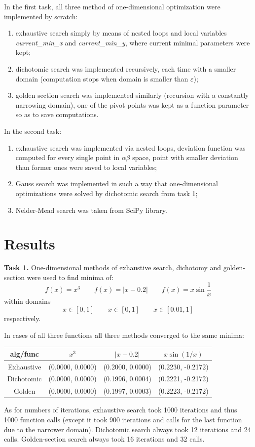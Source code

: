 \documentclass[12pt, a4paper]{article}
\begin{document}
In the first task, all three method of one-dimensional optimization were implemented by scratch: 
\begin{enumerate}
	\item exhaustive search simply by means of nested loops and local variables \textit{current\_min\_x} and \textit{current\_min\_y}, where current minimal parameters were kept;
	\item dichotomic search was implemented recursively, each time with a smaller domain (computation stops when domain is smaller than $\varepsilon$);
	\item golden section search was implemented similarly (recursion with a constantly narrowing domain), one of the pivot points was kept as a function parameter so as to save computations.
\end{enumerate}

In the second task:
\begin{enumerate}
	\item exhaustive search was implemented via nested loops, deviation function was computed for every single point in $\alpha \beta$ space, point with smaller deviation than former ones were saved to local variables;
	\item Gauss search was implemented in such a way that one-dimensional optimizations were solved by dichotomic search from task 1;
	\item Nelder-Mead search was taken from SciPy library.
\end{enumerate}

\newpage

\section*{Results}

\textbf{Task 1.} One-dimensional methods of exhaustive search, dichotomy and golden-section were used to find minima of:
\[ f(x) = x^3 \qquad f(x) = |x-0.2| \qquad f(x) = x\sin \frac{1}{x} \]
within domains
\[ x\in [0,1] \qquad x\in [0,1] \qquad x\in [0.01, 1] \]
respectively.

In cases of all three functions all three methods converged to the same minima:
\begin{center}
\begin{tabular}{cccc}
\hline
alg/func   & $x^3$            & $|x-0.2|$        & $x\sin (1/x)$     \\ \hline
Exhaustive & (0.0000, 0.0000) & (0.2000, 0.0000) & (0.2230, -0.2172) \\
Dichotomic & (0.0000, 0.0000) & (0.1996, 0.0004) & (0.2221, -0.2172) \\
Golden     & (0.0000, 0.0000) & (0.1997, 0.0003) & (0.2223, -0.2172) \\ \hline
\end{tabular}
\end{center}
As for numbers of iterations, exhaustive search took 1000 iterations and thus 1000 function calls (except it took 900 iterations and calls for the last function due to the narrower domain). Dichotomic search always took 12 iterations and 24 calls. Golden-section search always took 16 iterations and 32 calls.
\end{document}
